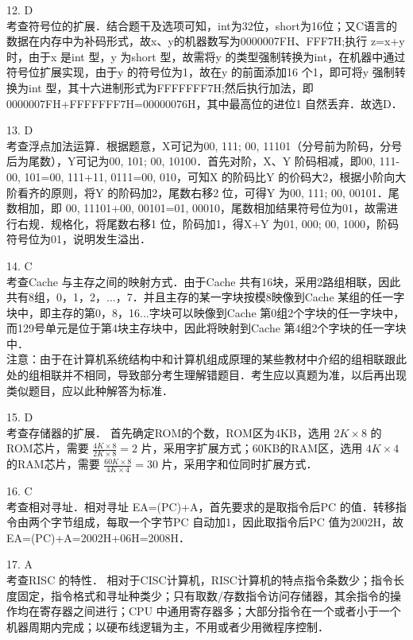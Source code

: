 12. D \\
考查符号位的扩展．结合题干及选项可知，int为32位，short为16位；又C语言的数据在内存中为补码形式，故x、y的机器数写为0000007FH、FFF7H;执行 z=x+y 时，由于x 是int 型，y 为short 型，故需将y 的类型强制转换为int，在机器中通过符号位扩展实现，由于y 的符号位为1，故在y 的前面添加16 个1，即可将y 强制转换为int 型，其十六进制形式为FFFFFFF7H;然后执行加法，即0000007FH+FFFFFFF7H=00000076H，其中最高位的进位1 自然丢弃．故选D．

13. D \\
考查浮点加法运算．根据题意，X可记为00, 111; 00, 11101（分号前为阶码，分号后为尾数），Y可记为00, 101; 00, 10100．首先对阶，X、Y 阶码相减，即00, 111-00, 101=00, 111+11, 0111=00, 010，可知X 的阶码比Y 的价码大2，根据小阶向大阶看齐的原则，将Y 的阶码加2，尾数右移2 位，可得Y 为00, 111; 00, 00101．尾数相加，即 00, 11101+00, 00101=01, 00010，尾数相加结果符号位为01，故需进行右规．规格化，将尾数右移1 位，阶码加1，得X+Y 为01, 000; 00, 1000，阶码符号位为01，说明发生溢出．

14. C \\
考查Cache 与主存之间的映射方式．由于Cache 共有16块，采用2路组相联，因此共有8组，0，1，2，...，7．并且主存的某一字块按模8映像到Cache 某组的任一字块中，即主存的第0，8，16...字块可以映像到Cache 第0组2个字块的任一字块中，而129号单元是位于第4块主存块中，因此将映射到Cache 第4组2个字块的任一字块中． \\
注意：由于在计算机系统结构中和计算机组成原理的某些教材中介绍的组相联跟此处的组相联并不相同，导致部分考生理解错题目．考生应以真题为准，以后再出现类似题目，应以此种解答为标准．

15. D \\
考查存储器的扩展．
首先确定ROM的个数，ROM区为4KB，选用 $2K\times8$ 的ROM芯片，需要 $\frac{4K\times8}{2K\times8}=2$ 片，采用字扩展方式；60KB的RAM区，选用 $4K\times4$ 的RAM芯片，需要 $\frac{60K\times8}{4K\times4}=30$ 片，采用字和位同时扩展方式．

16. C \\
考查相对寻址．相对寻址 EA=(PC)+A，首先要求的是取指令后PC 的值．转移指令由两个字节组成，每取一个字节PC 自动加1，因此取指令后PC 值为2002H，故EA=(PC)+A=2002H+06H=2008H．

17. A \\
考查RISC 的特性．
相对于CISC计算机，RISC计算机的特点指令条数少；指令长度固定，指令格式和寻址种类少；只有取数/存数指令访问存储器，其余指令的操作均在寄存器之间进行；CPU 中通用寄存器多；大部分指令在一个或者小于一个机器周期内完成；以硬布线逻辑为主，不用或者少用微程序控制．


